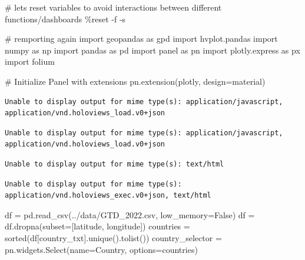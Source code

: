 \documentclass[
  letterpaper,
  DIV=11,
  numbers=noendperiod]{scrreprt}
\newenvironment{Shaded}{\begin{snugshade}}{\end{snugshade}}
\newcommand{\BuiltInTok}[1]{\textcolor[rgb]{0.00,0.23,0.31}{#1}}
\newcommand{\CommentTok}[1]{\textcolor[rgb]{0.37,0.37,0.37}{#1}}
\newcommand{\ImportTok}[1]{\textcolor[rgb]{0.00,0.46,0.62}{#1}}
\newcommand{\NormalTok}[1]{\textcolor[rgb]{0.00,0.23,0.31}{#1}}
\newcommand{\OperatorTok}[1]{\textcolor[rgb]{0.37,0.37,0.37}{#1}}
\newcommand{\StringTok}[1]{\textcolor[rgb]{0.13,0.47,0.30}{#1}}
\newcommand{\VariableTok}[1]{\textcolor[rgb]{0.07,0.07,0.07}{#1}}
\begin{document}
\begin{Shaded}
\begin{Highlighting}[]
\CommentTok{\# let\textquotesingle{}s reset variables to avoid interactions between different functions/dashboards}
\OperatorTok{\%}\NormalTok{reset }\OperatorTok{{-}}\NormalTok{f }\OperatorTok{{-}}\NormalTok{s}

\CommentTok{\# remporting again}
\ImportTok{import}\NormalTok{ geopandas }\ImportTok{as}\NormalTok{ gpd}
\ImportTok{import}\NormalTok{ hvplot.pandas}
\ImportTok{import}\NormalTok{ numpy }\ImportTok{as}\NormalTok{ np}
\ImportTok{import}\NormalTok{ pandas }\ImportTok{as}\NormalTok{ pd}
\ImportTok{import}\NormalTok{ panel }\ImportTok{as}\NormalTok{ pn}
\ImportTok{import}\NormalTok{ plotly.express }\ImportTok{as}\NormalTok{ px}
\ImportTok{import}\NormalTok{ folium}

\CommentTok{\# Initialize Panel with extensions}
\NormalTok{pn.extension(}\StringTok{\textquotesingle{}plotly\textquotesingle{}}\NormalTok{, design}\OperatorTok{=}\StringTok{\textquotesingle{}material\textquotesingle{}}\NormalTok{)}
\end{Highlighting}
\end{Shaded}

\begin{verbatim}
Unable to display output for mime type(s): application/javascript, application/vnd.holoviews_load.v0+json
\end{verbatim}

\begin{verbatim}
Unable to display output for mime type(s): application/javascript, application/vnd.holoviews_load.v0+json
\end{verbatim}

\begin{verbatim}
Unable to display output for mime type(s): text/html
\end{verbatim}

\begin{verbatim}
Unable to display output for mime type(s): application/vnd.holoviews_exec.v0+json, text/html
\end{verbatim}

\begin{Shaded}
\begin{Highlighting}[]
\NormalTok{df }\OperatorTok{=}\NormalTok{ pd.read\_csv(}\StringTok{\textquotesingle{}../data/GTD\_2022.csv\textquotesingle{}}\NormalTok{, low\_memory}\OperatorTok{=}\VariableTok{False}\NormalTok{)}
\NormalTok{df }\OperatorTok{=}\NormalTok{ df.dropna(subset}\OperatorTok{=}\NormalTok{[}\StringTok{\textquotesingle{}latitude\textquotesingle{}}\NormalTok{, }\StringTok{\textquotesingle{}longitude\textquotesingle{}}\NormalTok{])}
\NormalTok{countries }\OperatorTok{=} \BuiltInTok{sorted}\NormalTok{(df[}\StringTok{\textquotesingle{}country\_txt\textquotesingle{}}\NormalTok{].unique().tolist())}
\NormalTok{country\_selector }\OperatorTok{=}\NormalTok{ pn.widgets.Select(name}\OperatorTok{=}\StringTok{\textquotesingle{}Country\textquotesingle{}}\NormalTok{, options}\OperatorTok{=}\NormalTok{countries)}
\end{Highlighting}
\end{Shaded}
\end{document}
